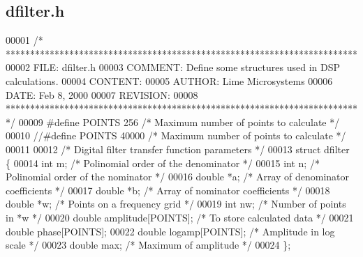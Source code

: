 \subsection{dfilter.\+h}
\label{dfilter_8h_source}

\begin{DoxyCode}
00001 \textcolor{comment}{/* ************************************************************************ }
00002 \textcolor{comment}{   FILE:    dfilter.h}
00003 \textcolor{comment}{   COMMENT: Define some structures used in DSP calculations.}
00004 \textcolor{comment}{   CONTENT:}
00005 \textcolor{comment}{   AUTHOR:  Lime Microsystems}
00006 \textcolor{comment}{   DATE:    Feb 8, 2000}
00007 \textcolor{comment}{   REVISION:}
00008 \textcolor{comment}{   ************************************************************************ */}
00009 \textcolor{preprocessor}{#define POINTS  256 }\textcolor{comment}{/* Maximum number of points to calculate */}\textcolor{preprocessor}{}
00010 \textcolor{comment}{//#define POINTS  40000 /* Maximum number of points to calculate */}
00011 
00012 \textcolor{comment}{/* Digital filter transfer function parameters */}
00013 \textcolor{keyword}{struct }dfilter \{
00014     \textcolor{keywordtype}{int} m;      \textcolor{comment}{/* Polinomial order of the denominator */}
00015     \textcolor{keywordtype}{int} n;      \textcolor{comment}{/* Polinomial order of the nominator */}
00016     \textcolor{keywordtype}{double} *a;  \textcolor{comment}{/* Array of denominator coefficients */}
00017     \textcolor{keywordtype}{double} *b;  \textcolor{comment}{/* Array of nominator coefficients */}
00018     \textcolor{keywordtype}{double} *w;  \textcolor{comment}{/* Points on a frequency grid */}
00019     \textcolor{keywordtype}{int} nw;     \textcolor{comment}{/* Number of points in *w */}
00020     \textcolor{keywordtype}{double} amplitude[POINTS];   \textcolor{comment}{/* To store calculated data */}
00021     \textcolor{keywordtype}{double} phase[POINTS];
00022     \textcolor{keywordtype}{double} logamp[POINTS];      \textcolor{comment}{/* Amplitude in log scale */}
00023     \textcolor{keywordtype}{double} max;         \textcolor{comment}{/* Maximum of amplitude */}
00024 \};
\end{DoxyCode}
